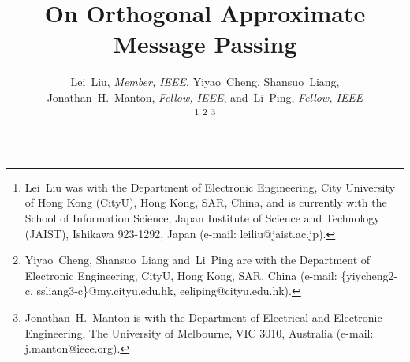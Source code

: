 \documentclass[journal]{IEEEtran}
\begin{document}
\title{On Orthogonal Approximate Message Passing} %

 

\author{{Lei~Liu, \textit{Member, IEEE}, Yiyao~Cheng, Shansuo~Liang, \\Jonathan~H.~Manton, \textit{Fellow, IEEE}, and~Li~Ping, \textit{Fellow, IEEE}}

\thanks{Lei~Liu was with the Department of Electronic Engineering, City University of Hong Kong (CityU), Hong Kong, SAR, China, and is currently with the School of Information Science, Japan Institute of Science and Technology (JAIST), Ishikawa 923-1292, Japan (e-mail: leiliu@jaist.ac.jp).} %
\thanks{Yiyao~Cheng, Shansuo~Liang and~Li~Ping are with the Department of Electronic Engineering, CityU, Hong Kong, SAR, China (e-mail:   \{yiycheng2-c, ssliang3-c\}@my.cityu.edu.hk, eeliping@cityu.edu.hk).}
\thanks{Jonathan~H.~Manton is with the Department of Electrical and Electronic Engineering, The University of Melbourne, VIC 3010, Australia (e-mail: j.manton@ieee.org).}
}

\maketitle
\end{document}
